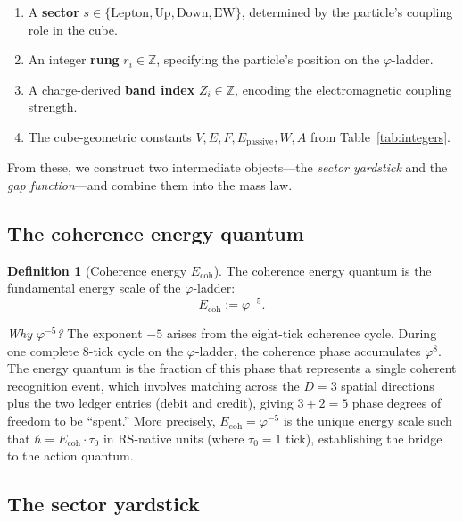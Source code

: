 \documentclass[11pt,a4paper]{article}
\theoremstyle{definition}
\newtheorem{definition}[theorem]{Definition}
\theoremstyle{remark}
\newcommand{\phig}{\varphi}
\newcommand{\Ecoh}{E_{\mathrm{coh}}}
\newcommand{\Epass}{E_{\mathrm{passive}}}
\newcommand{\Zidx}{Z}
\begin{document}
\begin{enumerate}[nosep,label=(\roman*)]
  \item A \textbf{sector} $s \in \{\text{Lepton}, \text{Up}, \text{Down},
        \text{EW}\}$, determined by the particle's coupling role in the cube.
  \item An integer \textbf{rung} $r_i \in \mathbb{Z}$, specifying the
        particle's position on the $\phig$-ladder.
  \item A charge-derived \textbf{band index} $\Zidx_i \in \mathbb{Z}$,
        encoding the electromagnetic coupling strength.
  \item The cube-geometric constants $V, E, F, \Epass, W, A$ from
        Table~\ref{tab:integers}.
\end{enumerate}

\noindent
From these, we construct two intermediate objects---the \emph{sector
yardstick} and the \emph{gap function}---and combine them into the mass law.

\subsection{The coherence energy quantum}

\begin{definition}[Coherence energy $\Ecoh$]
\label{def:Ecoh}
The coherence energy quantum is the fundamental energy scale of the
$\phig$-ladder:
\begin{equation}
  \Ecoh := \phig^{-5}.
  \label{eq:Ecoh}
\end{equation}
\end{definition}

\noindent\textit{Why $\phig^{-5}$?}\quad
The exponent $-5$ arises from the eight-tick coherence cycle.  During one
complete 8-tick cycle on the $\phig$-ladder, the coherence phase accumulates
$\phig^8$.  The energy quantum is the fraction of this phase that represents
a single coherent recognition event, which involves matching across the
$D = 3$ spatial directions plus the two ledger entries (debit and credit),
giving $3 + 2 = 5$ phase degrees of freedom to be ``spent.''  More precisely,
$\Ecoh = \phig^{-5}$ is the unique energy scale such that
$\hbar = \Ecoh \cdot \tau_0$ in RS-native units (where $\tau_0 = 1$ tick),
establishing the bridge to the action quantum.

\subsection{The sector yardstick}
\end{document}
